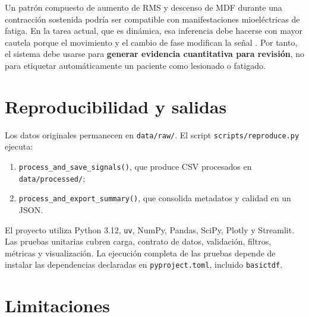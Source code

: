 \documentclass[11pt,spanish]{article}
\begin{document}
Un patrón compuesto de aumento de RMS y descenso de MDF durante una contracción sostenida podría ser compatible con manifestaciones mioeléctricas de fatiga. En la tarea actual, que es dinámica, esa inferencia debe hacerse con mayor cautela porque el movimiento y el cambio de fase modifican la señal \cite{hug2024,zwarts1999}. Por tanto, el sistema debe usarse para \textbf{generar evidencia cuantitativa para revisión}, no para etiquetar automáticamente un paciente como lesionado o fatigado.

\section{Reproducibilidad y salidas}

Los datos originales permanecen en \texttt{data/raw/}. El script \texttt{scripts/reproduce.py} ejecuta:
\begin{enumerate}
    \item \texttt{process\_and\_save\_signals()}, que produce CSV procesados en \texttt{data/processed/};
    \item \texttt{process\_and\_export\_summary()}, que consolida metadatos y calidad en un JSON.
\end{enumerate}

El proyecto utiliza Python 3.12, \texttt{uv}, NumPy, Pandas, SciPy, Plotly y Streamlit. Las pruebas unitarias cubren carga, contrato de datos, validación, filtros, métricas y visualización. La ejecución completa de las pruebas depende de instalar las dependencias declaradas en \texttt{pyproject.toml}, incluido \texttt{basictdf}.

\section{Limitaciones}
\end{document}
